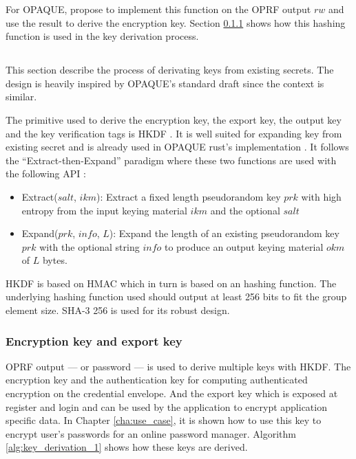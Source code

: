 \documentclass[../report.tex]{subfiles}
\begin{document}
For OPAQUE, \cite{OPAQUE_Standard_Draft} propose to implement this function on the OPRF output $rw$ and use the result to derive the encryption key. Section \ref{sec:encryption_key} shows how this hashing function is used in the key derivation process.





\subsection{}

This section describe the process of derivating keys from existing secrets. The design is heavily inspired by OPAQUE's standard draft \cite{OPAQUE_Standard_Draft} since the context is similar.


The primitive used to derive the encryption key, the export key, the output key and the key verification tags is HKDF \cite{HKDF_RFC}. It is well suited for expanding key from existing secret and is already used in OPAQUE rust's implementation \cite{OPAQUE_KE_lib}. It follows the ``Extract-then-Expand'' paradigm where these two functions are used with the following API :

\begin{itemize}
 \item Extract($salt$, $ikm$): Extract a fixed length pseudorandom key $prk$ with high entropy from the input keying material $ikm$ and the optional $salt$
 \item Expand($prk$, $info$, $L$): Expand the length of an existing pseudorandom key $prk$ with the optional string $info$ to produce an output keying material $okm$ of $L$ bytes.
\end{itemize}

HKDF is based on HMAC which in turn is based on an hashing function. The underlying hashing function used should output at least 256 bits to fit the group element size. SHA-3 256 is used for its robust design.



\subsubsection{Encryption key and export key}
\label{sec:encryption_key}

OPRF output --- or password --- is used to derive multiple keys with HKDF. The encryption key and the authentication key for computing authenticated encryption on the credential envelope. And the export key which is exposed at register and login and can be used by the application to encrypt application specific data. In Chapter \ref{cha:use_case}, it is shown how to use this key to encrypt user's passwords for an online password manager.
Algorithm \ref{alg:key_derivation_1} shows how these keys are derived.
\end{document}
